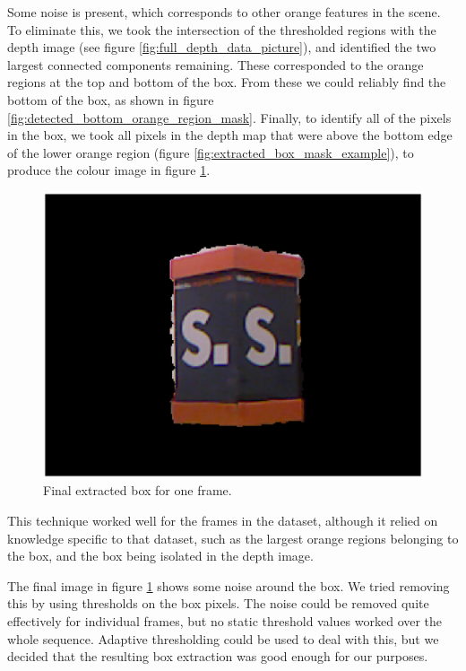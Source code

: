\documentclass[12pt,a4paper,onecolumn]{article}
\begin{document}
Some noise is present, which corresponds to other orange features in the scene.  To eliminate this, we took the intersection of the thresholded regions with the depth image (see figure \ref{fig:full_depth_data_picture}), and identified the two largest connected components remaining.  These corresponded to the orange regions at the top and bottom of the box.  From these we could reliably find the bottom of the box, as shown in figure \ref{fig:detected_bottom_orange_region_mask}.  Finally, to identify all of the pixels in the box, we took all pixels in the depth map that were above the bottom edge of the lower orange region (figure \ref{fig:extracted_box_mask_example}), to produce the colour image in figure \ref{fig:extracted_box_example}.

\begin{figure}[!ht]
  \centering
  \includegraphics[width=1.0\textwidth]{figs/extracted_box_example}
  \caption{Final extracted box for one frame.}
  \label{fig:extracted_box_example}
\end{figure}

This technique worked well for the frames in the dataset, although it relied on knowledge specific to that dataset, such as the largest orange regions belonging to the box, and the box being isolated in the depth image.

The final image in figure \ref{fig:extracted_box_example} shows some noise around the box.  We tried removing this by using thresholds on the box pixels.  The noise could be removed quite effectively for individual frames, but no static threshold values worked over the whole sequence.  Adaptive thresholding could be used to deal with this, but we decided that the resulting box extraction was good enough for our purposes.
\end{document}

